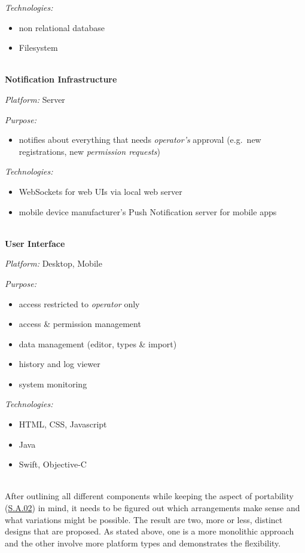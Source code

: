 \documentclass[12pt,english,a4paper,titlepage,cleardoublepage=empty,dottedtoc]{report}
\providecommand{\tightlist}{%
  \setlength{\itemsep}{0pt}\setlength{\parskip}{0pt}}
\begin{document}
\emph{Technologies:}

\begin{itemize}
\tightlist
\item
  non relational database
\item
  Filesystem
\end{itemize}

~\\
\textbf{Notification Infrastructure}

\emph{Platform:} Server

\emph{Purpose:}

\begin{itemize}
\tightlist
\item
  notifies about everything that needs \emph{operator's} approval
  (e.g.~new registrations, new \emph{permission requests})
\end{itemize}

\emph{Technologies:}

\begin{itemize}
\tightlist
\item
  WebSockets for web UIs via local web server
\item
  mobile device manufacturer's Push Notification server for mobile apps
\end{itemize}

~\\
\textbf{User Interface}

\emph{Platform:} Desktop, Mobile

\emph{Purpose:}

\begin{itemize}
\tightlist
\item
  access restricted to \emph{operator} only
\item
  access \& permission management
\item
  data management (editor, types \& import)
\item
  history and log viewer
\item
  system monitoring
\end{itemize}

\emph{Technologies:}

\begin{itemize}
\tightlist
\item
  HTML, CSS, Javascript
\item
  Java
\item
  Swift, Objective-C
\end{itemize}

~\\
After outlining all different components while keeping the aspect of
portability (\protect\hyperlink{sa02}{S.A.02}) in mind, it needs to be
figured out which arrangements make sense and what variations might be
possible. The result are two, more or less, distinct designs that are
proposed. As stated above, one is a more monolithic approach and the
other involve more platform types and demonstrates the flexibility.
\end{document}
